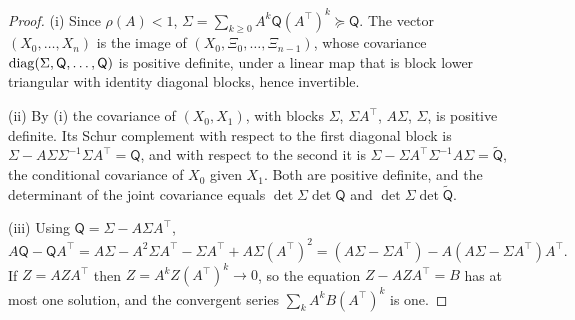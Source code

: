 \begin{proof}
(i) Since $\rho(A)<1$, $\Sigma=\sum_{k\ge0}A^k\mathsf Q(A^\top)^k\succeq\mathsf Q$. The vector $(X_0,\dots,X_n)$ is the image of $(X_0,\Xi_0,\dots,\Xi_{n-1})$, whose covariance $\operatorname{diag}(\Sigma,\mathsf Q,\dots,\mathsf Q)$ is positive definite, under a linear map that is block lower triangular with identity diagonal blocks, hence invertible.

(ii) By (i) the covariance of $(X_0,X_1)$, with blocks $\Sigma$, $\Sigma A^\top$, $A\Sigma$, $\Sigma$, is positive definite. Its Schur complement with respect to the first diagonal block is $\Sigma-A\Sigma\Sigma^{-1}\Sigma A^\top=\mathsf Q$, and with respect to the second it is $\Sigma-\Sigma A^\top\Sigma^{-1}A\Sigma=\widetilde{\mathsf Q}$, the conditional covariance of $X_0$ given $X_1$. Both are positive definite, and the determinant of the joint covariance equals $\det\Sigma\det\mathsf Q$ and $\det\Sigma\det\widetilde{\mathsf Q}$.

(iii) Using $\mathsf Q=\Sigma-A\Sigma A^\top$,
\[
A\mathsf Q-\mathsf QA^\top=A\Sigma-A^2\Sigma A^\top-\Sigma A^\top+A\Sigma(A^\top)^2=(A\Sigma-\Sigma A^\top)-A(A\Sigma-\Sigma A^\top)A^\top .
\]
If $Z=AZA^\top$ then $Z=A^kZ(A^\top)^k\to0$, so the equation $Z-AZA^\top=B$ has at most one solution, and the convergent series $\sum_kA^kB(A^\top)^k$ is one.
\end{proof}

